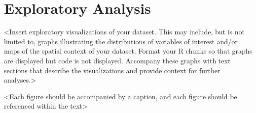 \documentclass[12pt,]{article}
\begin{document}
\newpage

\hypertarget{exploratory-analysis}{%
\section{Exploratory Analysis}\label{exploratory-analysis}}

\textless{}Insert exploratory visualizations of your dataset. This may
include, but is not limited to, graphs illustrating the distributions of
variables of interest and/or maps of the spatial context of your
dataset. Format your R chunks so that graphs are displayed but code is
not displayed. Accompany these graphs with text sections that describe
the visualizations and provide context for further
analyses.\textgreater{}

\textless{}Each figure should be accompanied by a caption, and each
figure should be referenced within the text\textgreater{}
\end{document}
